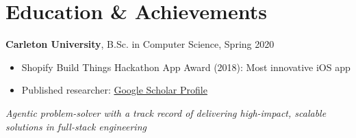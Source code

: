 \documentclass[9pt]{article}
\begin{document}
\section*{Education \& Achievements}
\textbf{Carleton University}, B.Sc. in Computer Science, Spring 2020
\begin{itemize}
    \setlength\itemsep{0em}
    \item Shopify Build Things Hackathon App Award (2018): Most innovative iOS app
    \item Published researcher: \href{https://scholar.google.ca/citations?user=zFDREhgAAAAJ\&hl=en}{Google Scholar Profile}
\end{itemize}

\vspace{-0.5em}
\begin{center}
    \textit{Agentic problem-solver with a track record of delivering high-impact, scalable solutions in full-stack engineering}
\end{center}
\end{document}
